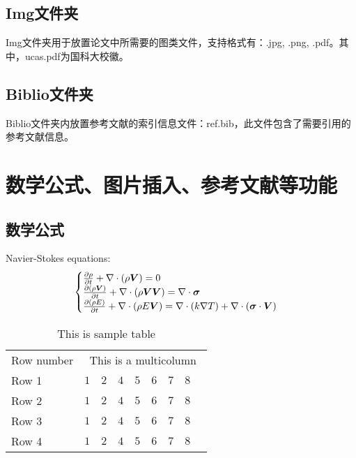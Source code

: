\subsection{Img文件夹}

Img文件夹用于放置论文中所需要的图类文件，支持格式有：.jpg, .png, .pdf。其中，ucas.pdf为国科大校徽。

\subsection{Biblio文件夹}

Biblio文件夹内放置参考文献的索引信息文件：ref.bib，此文件包含了需要引用的参考文献信息。

\section{数学公式、图片插入、参考文献等功能}

\subsection{数学公式}

Navier-Stokes equations:
\begin{equation} \label{eq:ns}
    \begin{cases}
        \frac{\partial \rho}{\partial t} + \nabla\cdot(\rho\boldsymbol{V}) = 0 \\
        \frac{\partial (\rho\boldsymbol{V})}{\partial t} + \nabla\cdot(\rho\boldsymbol{V}\boldsymbol{V}) = \nabla\cdot\boldsymbol{\mathsf{\sigma}}\\
        \frac{\partial (\rho E)}{\partial t} + \nabla\cdot(\rho E\boldsymbol{V}) = \nabla\cdot(k\nabla T) + \nabla\cdot(\boldsymbol{\mathsf{\sigma}}\cdot\boldsymbol{V})
    \end{cases}
\end{equation}

\begin{table}[!htbp]
    \centering
    \footnotesize%
    \setlength{\tabcolsep}{4pt}%
    \renewcommand{\arraystretch}{1.2}%
    \begin{tabular}{lcccccccc}
        \hline\hline
        Row number & \multicolumn{8}{c}{This is a multicolumn} \\
        \cline{2-9}%
        Row 1 & $1$ & $2$ & $4$ & $5$ & $6$ & $7$ & $8$\\
        \hline
        Row 2 & $1$ & $2$ & $4$ & $5$ & $6$ & $7$ & $8$\\
        \hline
        Row 3 & $1$ & $2$ & $4$ & $5$ & $6$ & $7$ & $8$\\
        \hline
        Row 4 & $1$ & $2$ & $4$ & $5$ & $6$ & $7$ & $8$\\
        \hline\hline
    \end{tabular}
    \caption{This is sample table}
    \label{tab:sample}
\end{table}

